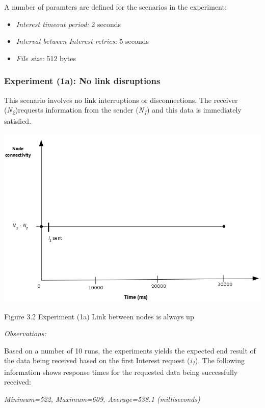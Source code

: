 \documentclass[a4paper,12pt]{report}      %
\begin{document}
\noindent A number of paramters are defined for the scenarios in the experiment:
\begin{itemize}
\item \textsl{Interest timeout period:}  2 seconds
\item \textsl{Interval between Interest retries:} 5 seconds
\item \textsl{File size:} 512 bytes
\end{itemize}

\subsubsection{Experiment (1a): No link disruptions}

This scenario involves no link interruptions or disconnections. The receiver (\emph{N\textsubscript{2}})requests information from
the sender (\emph{N\textsubscript{1}}) and this data is immediately satisfied.

\noindent\includegraphics[scale=0.55]{exp1a_timediag.jpg}\newline
\begin{center}Figure 3.2 Experiment (1a) Link between nodes is always up\end{center}

\vspace*{1\baselineskip}\noindent\emph{Observations:}

Based on a number of 10 runs, the experiments yields the expected end result of the data being received
based on the first Interest request (\emph{i\textsubscript{1}}). The following information shows response times for the requested
data being successfully received:

\begin{center}\textsl{Minimum=522, Maximum=609, Average=538.1 (milliseconds)}\end{center}
\end{document}

